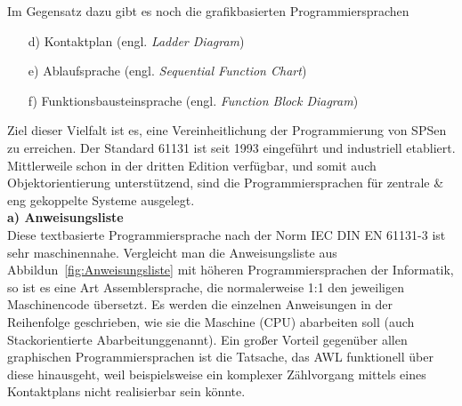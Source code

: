 	Im Gegensatz dazu gibt es noch die grafikbasierten Programmiersprachen
	
	\begin{itemize}
		\item[d)] Kontaktplan (engl. \textit{Ladder Diagram})
		\item[e)] Ablaufsprache (engl. \textit{Sequential Function Chart})
		\item[f)] Funktionsbausteinsprache (engl. \textit{Function Block Diagram})
	\end{itemize}
	
	Ziel dieser Vielfalt ist es, eine Vereinheitlichung der Programmierung von SPSen zu erreichen. Der Standard 61131 ist seit 1993 eingeführt und industriell etabliert. Mittlerweile schon in der dritten Edition verfügbar, und somit auch Objektorientierung unterstützend, sind die Programmiersprachen für zentrale \& eng gekoppelte Systeme ausgelegt.\\
	
	\textbf{a) Anweisungsliste}\\
	
	Diese textbasierte Programmiersprache nach der Norm IEC DIN EN 61131-3 ist sehr maschinennahe. Vergleicht man die Anweisungsliste aus Abbildun~\ref{fig:Anweisungsliste} mit höheren Programmiersprachen der Informatik, so ist es eine Art Assemblersprache, die normalerweise 1:1 den jeweiligen Maschinencode übersetzt. Es werden die einzelnen Anweisungen in der Reihenfolge geschrieben, wie sie die Maschine (CPU) abarbeiten soll (auch \glqq Stackorientierte Abarbeitung\grqq \space genannt). Ein großer Vorteil gegenüber allen graphischen Programmiersprachen ist die Tatsache, das AWL funktionell über diese hinausgeht, weil beispielsweise ein komplexer Zählvorgang mittels eines Kontaktplans nicht realisierbar sein könnte.	\cite{spslehrgang_struktur, egroetsch_sps}\\

